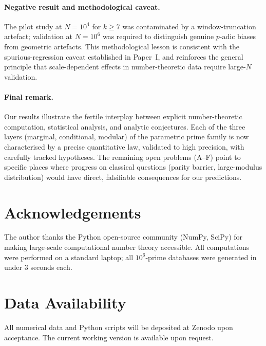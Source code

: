 \documentclass[11pt,a4paper]{article}
\theoremstyle{plain}
\theoremstyle{definition}
\begin{document}
\paragraph{Negative result and methodological caveat.} The pilot study at
$N = 10^4$ for $k \ge 7$ was contaminated by a window-truncation artefact;
validation at $N = 10^6$ was required to distinguish genuine $p$-adic biases
from geometric artefacts. This methodological lesson is consistent with the
spurious-regression caveat established in Paper~I, and reinforces the general
principle that scale-dependent effects in number-theoretic data require
large-$N$ validation.

\paragraph{Final remark.} Our results illustrate the fertile interplay
between explicit number-theoretic computation, statistical analysis, and
analytic conjectures. Each of the three layers (marginal, conditional,
modular) of the parametric prime family is now characterised by a precise
quantitative law, validated to high precision, with carefully tracked
hypotheses. The remaining open problems (A--F) point to specific places
where progress on classical questions (parity barrier, large-modulus
distribution) would have direct, falsifiable consequences for our predictions.

\section*{Acknowledgements}
The author thanks the Python open-source community (NumPy, SciPy) for making
large-scale computational number theory accessible. All computations were
performed on a standard laptop; all $10^6$-prime databases were generated
in under 3 seconds each.

\section*{Data Availability}

All numerical data and Python scripts will be deposited at Zenodo upon
acceptance. The current working version is available upon request.
\end{document}
